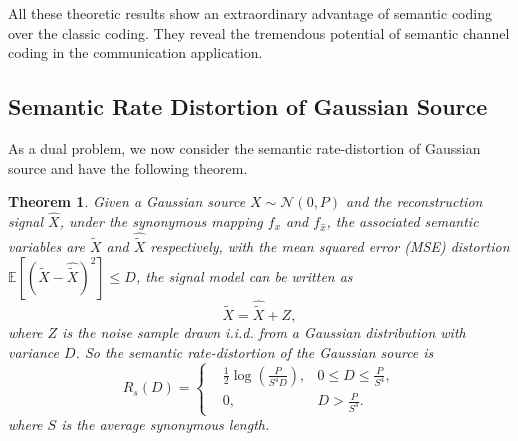 \documentclass[12pt, draftclsnofoot,onecolumn]{IEEEtran}
\newtheorem{theorem}{\bf{Theorem}}
\begin{document}
All these theoretic results show an extraordinary advantage of semantic coding over the classic coding. They reveal the tremendous potential of semantic channel coding in the communication application.

\subsection{Semantic Rate Distortion of Gaussian Source}
As a dual problem, we now consider the semantic rate-distortion of Gaussian source and have the following theorem.

\begin{theorem}
Given a Gaussian source $X\sim \mathcal{N}(0,P)$ and the reconstruction signal $\hat{X}$, under the synonymous mapping $f_x$ and $f_{\hat{x}}$, the associated semantic variables are $\tilde{X}$ and $\hat{\tilde{X}}$ respectively, with the mean squared error (MSE) distortion $\mathbb{E}[(\tilde{X}-\hat{\tilde{X}})^2]\leq D$, the signal model can be written as
\begin{equation}
\tilde{X}=\hat{\tilde{X}}+Z,
\end{equation}
where $Z$ is the noise sample drawn i.i.d. from a Gaussian distribution with variance $D$. So the semantic rate-distortion of the Gaussian source is
\begin{equation}
R_s(D)=\left\{
\begin{aligned}
&\frac{1}{2}\log \left( \frac{P}{S^4 D}\right), &0\leq D \leq \frac{P}{S^4},\\
&0,  &D > \frac{P}{S^4}.
\end{aligned}\right.
\end{equation}
where $S$ is the average synonymous length.
\end{theorem}
\end{document}
